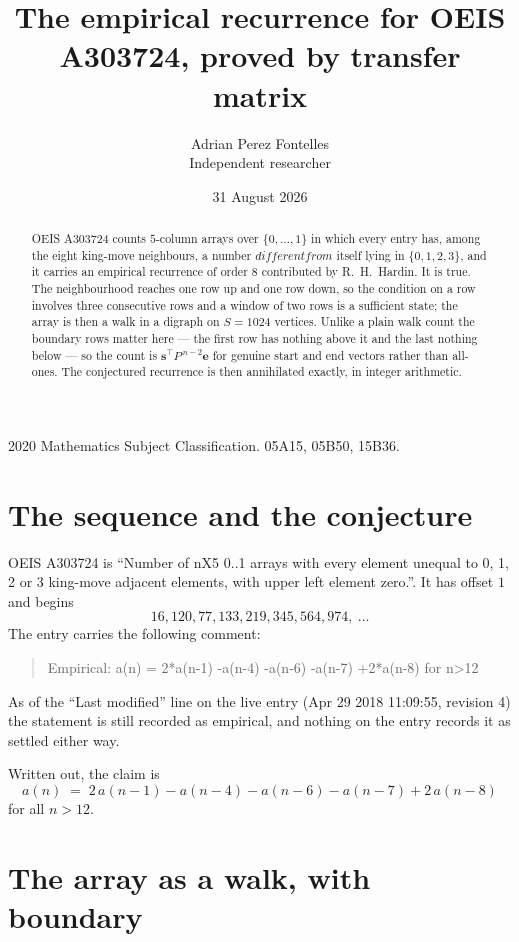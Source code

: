 \documentclass[11pt,a4paper]{article}
\title{The empirical recurrence for OEIS A303724, proved by transfer matrix}
\author{Adrian Perez Fontelles\\ \small Independent researcher}
\date{31 August 2026}
\theoremstyle{plain}
\theoremstyle{definition}
\begin{document}
\maketitle

\begin{abstract}
OEIS A303724 counts $5$-column arrays over $\{0,\dots,1\}$ in which every entry has,
among the eight king-move neighbours, a number $different from$ itself lying in $\{0,1,2,3\}$, and it carries an empirical
recurrence of order $8$ contributed by R.~H.~Hardin. It is true. The neighbourhood
reaches one row up and one row down, so the condition on a row involves three consecutive
rows and a window of two rows is a sufficient state; the array is then a walk in a digraph
on $S=1024$ vertices. Unlike a plain walk count the boundary rows matter here --- the first
row has nothing above it and the last nothing below --- so the count is
$\mathbf{s}^{\!\top}P^{\,n-2}\mathbf{e}$ for genuine start and end vectors rather than
all-ones. The conjectured recurrence is then annihilated exactly, in integer arithmetic.
\end{abstract}

\noindent\small 2020 Mathematics Subject Classification. 05A15, 05B50, 15B36.\normalsize

\section{The sequence and the conjecture}

OEIS A303724 is ``Number of nX5 0..1 arrays with every element unequal to 0, 1, 2 or 3 king-move adjacent elements, with upper left element zero.''. It has offset
$1$ and begins
\[
16, 120, 77, 133, 219, 345, 564, 974,\ \dots
\]
The entry carries the following comment:
\begin{quote}\small
Empirical: a(n) = 2*a(n-1) -a(n-4) -a(n-6) -a(n-7) +2*a(n-8) for n>12
\end{quote}
As of the ``Last modified'' line on the live entry (Apr 29 2018 11:09:55, revision
4) the statement is still recorded as empirical, and nothing on the entry
records it as settled either way.

Written out, the claim is
\begin{equation}\label{eq:conj}
a(n)\;=\;2\,a(n-1) - a(n-4) - a(n-6) - a(n-7) + 2\,a(n-8)
\end{equation}
for all $n>12$.

\section{The array as a walk, with boundary}
\end{document}
